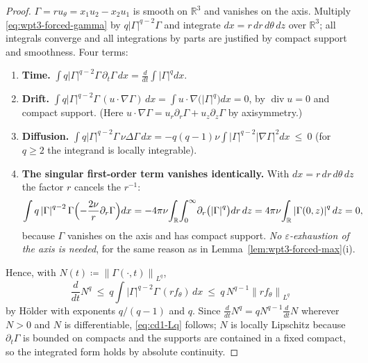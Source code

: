 \documentclass[11pt]{article}
\theoremstyle{definition}
\theoremstyle{remark}
\newcommand{\R}{\mathbb{R}}
\newcommand{\norm}[1]{\left\|#1\right\|}
\newcommand{\abs}[1]{\left|#1\right|}
\newcommand{\grad}{\nabla}
\newcommand{\divg}{\operatorname{div}}
\newcommand{\eps}{\varepsilon}
\begin{document}
\begin{proof}
  $\Gamma=ru_\theta=x_1u_2-x_2u_1$ is smooth on $\R^3$ and vanishes on the
  axis. Multiply \eqref{eq:wpt3-forced-gamma} by
  $q\abs\Gamma^{q-2}\Gamma$ and integrate $dx=r\,dr\,d\theta\,dz$ over
  $\R^3$; all integrals converge and all integrations by parts are justified
  by compact support and smoothness. Four terms:
  \begin{enumerate}[label=(\alph*),leftmargin=2.2em]
    \item \textbf{Time.} $\displaystyle\int
      q\abs\Gamma^{q-2}\Gamma\,\partial_t\Gamma\,dx
      =\frac{d}{dt}\int\abs\Gamma^{q}dx$.
    \item \textbf{Drift.} $\displaystyle\int
      q\abs\Gamma^{q-2}\Gamma\,(u\cdot\grad\Gamma)\,dx
      =\int u\cdot\grad\bigl(\abs\Gamma^{q}\bigr)dx=0$, by $\divg u=0$
      and compact support. (Here $u\cdot\grad\Gamma
      =u_r\partial_r\Gamma+u_z\partial_z\Gamma$ by axisymmetry.)
    \item \textbf{Diffusion.} $\displaystyle\int
      q\abs\Gamma^{q-2}\Gamma\,\nu\Delta\Gamma\,dx
      =-q(q-1)\nu\int\abs\Gamma^{q-2}\abs{\grad\Gamma}^2dx\ \leq\ 0$
      (for $q\geq2$ the integrand is locally integrable).
    \item \textbf{The singular first-order term vanishes identically.} With
      $dx=r\,dr\,d\theta\,dz$ the factor $r$ cancels the $r^{-1}$:
      \[
        \int q\abs\Gamma^{q-2}\Gamma\Bigl(-\frac{2\nu}{r}\partial_r\Gamma\Bigr)dx
        =-4\pi\nu\!\int_{\R}\!\int_0^\infty\!\partial_r\bigl(\abs\Gamma^{q}\bigr)
          dr\,dz
        =4\pi\nu\!\int_{\R}\abs{\Gamma(0,z)}^{q}dz=0,
      \]
      because $\Gamma$ vanishes on the axis and has compact support. \emph{No
      $\eps$-exhaustion of the axis is needed}, for the same reason as in
      Lemma~\ref{lem:wpt3-forced-max}(i).
  \end{enumerate}
  Hence, with $N(t)\coloneqq\norm{\Gamma(\cdot,t)}_{L^q}$,
  \[
    \frac{d}{dt}N^q\ \leq\ q\int\abs\Gamma^{q-2}\Gamma\,(rf_\theta)\,dx
      \ \leq\ q\,N^{q-1}\norm{rf_\theta}_{L^q}
  \]
  by H\"older with exponents $q/(q-1)$ and $q$. Since
  $\frac{d}{dt}N^q=qN^{q-1}\frac{d}{dt}N$ wherever $N>0$ and $N$ is
  differentiable, \eqref{eq:cd1-Lq} follows; $N$ is locally Lipschitz because
  $\partial_t\Gamma$ is bounded on compacts and the supports are contained in
  a fixed compact, so the integrated form holds by absolute continuity.
\end{proof}
\end{document}
